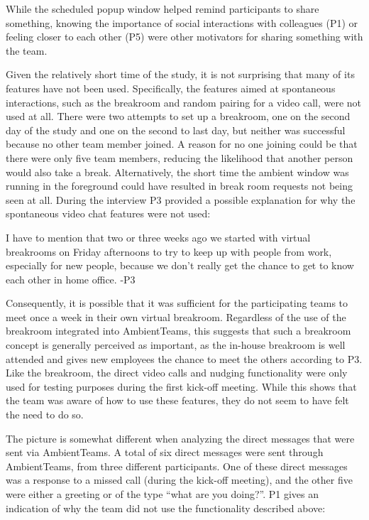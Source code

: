 While the scheduled popup window helped remind participants to share something, knowing the importance of social interactions with colleagues (P1) or feeling closer to each other (P5) were other motivators for sharing something with the team.

Given the relatively short time of the study, it is not surprising that many of its features have not been used. Specifically, the features aimed at spontaneous interactions, such as the breakroom and random pairing for a video call, were not used at all. There were two attempts to set up a breakroom, one on the second day of the study and one on the second to last day, but neither was successful because no other team member joined. A reason for no one joining could be that there were only five team members, reducing the likelihood that another person would also take a break. Alternatively, the short time the ambient window was running in the foreground could have resulted in break room requests not being seen at all. During the interview P3 provided a possible explanation for why the spontaneous video chat features were not used:

\begin{displayquote}[][]
    [...] I have to mention that two or three weeks ago we started with virtual breakrooms on Friday afternoons to try to keep up with people from work, especially for new people, because we don't really get the chance to get to know each other in home office. -P3
\end{displayquote}

Consequently, it is possible that it was sufficient for the participating teams to meet once a week in their own virtual breakroom. Regardless of the use of the breakroom integrated into AmbientTeams, this suggests that such a breakroom concept is generally perceived as important, as the in-house breakroom is well attended and gives new employees the chance to meet the others according to P3. Like the breakroom, the direct video calls and nudging functionality were only used for testing purposes during the first kick-off meeting. While this shows that the team was aware of how to use these features, they do not seem to have felt the need to do so.

The picture is somewhat different when analyzing the direct messages that were sent via AmbientTeams. A total of six direct messages were sent through AmbientTeams, from three different participants. One of these direct messages was a response to a missed call (during the kick-off meeting), and the other five were either a greeting or of the type \enquote{what are you doing?}. P1 gives an indication of why the team did not use the functionality described above:

